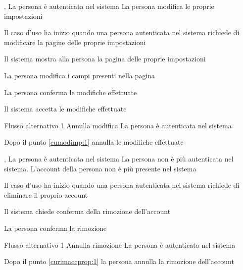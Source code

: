 {, }
{La persona è autenticata nel sistema}
{La persona modifica le proprie impostazioni}
{\begin{enumCU}
	\item Il caso d'uso ha inizio quando una persona autenticata nel sistema richiede di modificare la pagine delle proprie impostazioni
	\item Il sistema mostra alla persona la pagina delle proprie impostazioni
	\item La persona modifica i campi presenti nella pagina \label{cumodimp:1}
	\item La persona conferma le modifiche effettuate
	\item Il sistema accetta le modifiche effettuate
\end{enumCU}}
%
{Flusso alternativo 1}%
{Annulla modifica}%
{La persona è autenticata nel sistema}%
{\postNulle}%
{\begin{enumCU}
		\item Dopo il punto \ref{cumodimp:1} annulla le modifiche effettuate
	\end{enumCU}}%

\tabcuvspace

{, }
{La persona è autenticata nel sistema}
{La persona non è più autenticata nel sistema. L'account della persona non è più presente nel sistema}
{\begin{enumCU}
	\item Il caso d'uso ha inizio quando una persona autenticata nel sistema richiede di eliminare il proprio account
	\item Il sistema chiede conferma della rimozione dell'account \label{curimaccprop:1}
	\item La persona conferma la rimozione
\end{enumCU}}
%
{Flusso alternativo 1}%
{Annulla rimozione}%
{La persona è autenticata nel sistema}%
{\postNulle}%
{\begin{enumCU}
		\item Dopo il punto \ref{curimaccprop:1} la persona annulla la rimozione dell'account
	\end{enumCU}}%

\tabcuvspace

